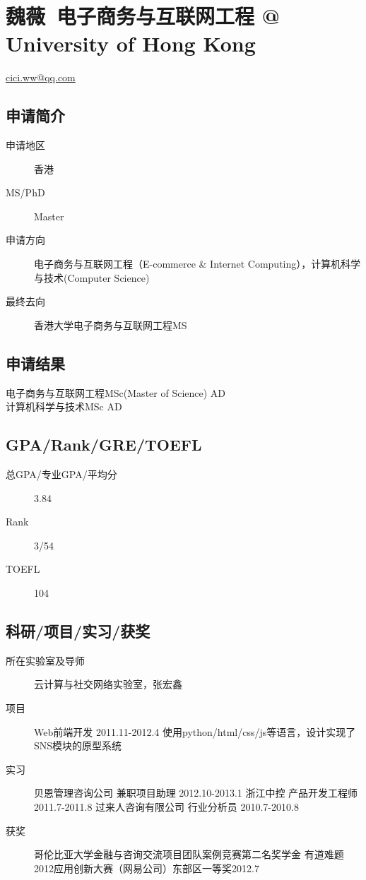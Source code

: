 \documentclass[11pt,fleqn,openany]{book} %
\begin{document}
\section{魏薇\ 电子商务与互联网工程 @ University of Hong Kong}
\hfill \href{mailto:cici.ww@qq.com}{cici.ww@qq.com}

\noindent\begin{minipage}[t]{0.45\textwidth}
\subsection*{申请简介}
\begin{description}
\item[申请地区] 香港
\item[MS/PhD] Master
\item[申请方向] 电子商务与互联网工程（E-commerce \& Internet Computing），计算机科学与技术(Computer Science)
\item[最终去向] 香港大学电子商务与互联网工程MS
\end{description}
\end{minipage}
\hfill
\begin{minipage}[t]{0.45\textwidth}
\subsection*{申请结果}
\noindent 电子商务与互联网工程MSc(Master of Science) AD\\
计算机科学与技术MSc AD
\end{minipage}
\subsection*{GPA/Rank/GRE/TOEFL}
\begin{description}
\item[总GPA/专业GPA/平均分] 3.84
\item[Rank] 3/54
\item[TOEFL] 104
\end{description}

\subsection*{科研/项目/实习/获奖}
\begin{description}
\item[所在实验室及导师] 云计算与社交网络实验室，张宏鑫
\item[项目] Web前端开发    2011.11-2012.4
使用python/html/css/js等语言，设计实现了SNS模块的原型系统
\item[实习] 贝恩管理咨询公司    兼职项目助理    2012.10-2013.1 
浙江中控    产品开发工程师    2011.7-2011.8 
过来人咨询有限公司    行业分析员    2010.7-2010.8
\item[获奖] 哥伦比亚大学金融与咨询交流项目团队案例竞赛第二名奖学金
有道难题2012应用创新大赛（网易公司）东部区一等奖2012.7
\end{description}
\end{document}
